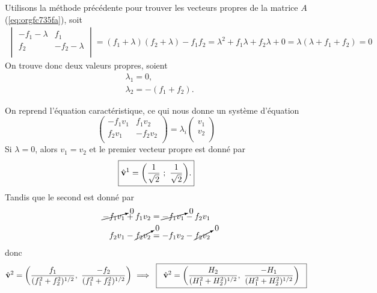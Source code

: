 \documentclass[10pt]{report}
\numberwithin{equation}{section}
\newcommand{\vv}{\vb{v}}
\begin{document}
Utilisons la méthode précédente pour trouver les vecteurs propres de la matrice \(A\) (\ref{eq:orgfc735fa}), soit
\begin{align}
   \begin{vmatrix}
     -f_1 - \lambda & f_1 \\
     f_2 & -f_2 - \lambda \\
   \end{vmatrix} = (f_1+\lambda)(f_2+\lambda) - f_1 f_2 = \lambda^2 + f_1 \lambda + f_2 \lambda + 0 =\boxed{ \lambda(\lambda + f_1 + f_2) = 0 }
\end{align}
On trouve donc deux valeurs propres, soient
\begin{subequations}
\begin{align}
   & \lambda_1 = 0, \\
   & \lambda_2 = - (f_1+f_2).
\end{align}
\end{subequations}

On reprend l'équation caractéristique, ce qui nous donne un système d'équation
\begin{equation}
   \begin{pmatrix}
     - f_1 v_1 & f_1 v_2 \\
     f_2 v_1 & -f_2 v_2 \\
   \end{pmatrix} = \lambda_i
   \begin{pmatrix}
     v_1\\
     v_2\\
   \end{pmatrix}
\end{equation}
Si \(\lambda = 0\), alors \(v_1 = v_2\) et le premier vecteur propre est donné par
\begin{equation}
   \boxed{\hat{\vv}^1 = \qty( \frac{1}{\sqrt{2}}\ ;\ \frac{1}{\sqrt{2}}).}
\end{equation}
Tandis que le second est donné par
\begin{align}
   \cancelto{0}{-f_1 v_1} + f_1 v_2 & = \cancelto{0}{-f_1 v_1} - f_2 v_1 \\
   f_2 v_1 - \cancelto{0}{f_2 v_2} & = -f_1 v_2 - \cancelto{0}{f_2 v_2} \\
\end{align}
donc
\begin{equation}
   \hat{\vv}^2 = \qty( \frac{f_1}{(f_1^2+f_2^2)^{1/2}},\ \frac{-f_2}{(f_1^2+f_2^2)^{1/2}})\ \Longrightarrow \hspace{0.2cm}\boxed{\hspace{0.2cm}\hat{\vv}^2=\qty( \frac{H_2}{(H_1^2+H_2^2)^{1/2}},\ \frac{-H_1}{(H_1^2+H_2^2)^{1/2}})\hspace{0.2cm}}
\end{equation}
\end{document}
